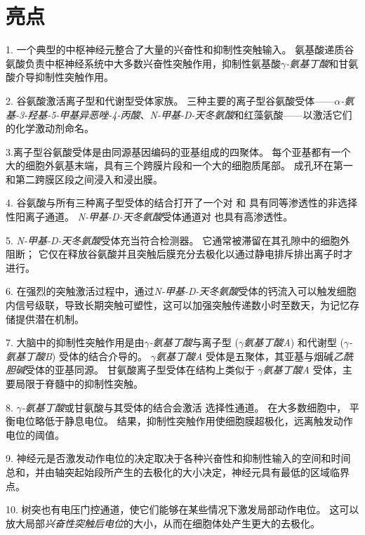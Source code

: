 \section{亮点}

1. 一个典型的中枢神经元整合了大量的兴奋性和抑制性突触输入。
氨基酸递质谷氨酸负责中枢神经系统中大多数兴奋性突触作用，抑制性氨基酸\textit{$\gamma$-氨基丁酸}和甘氨酸介导抑制性突触作用。


2. 谷氨酸激活离子型和代谢型受体家族。
三种主要的离子型谷氨酸受体——\textit{$\alpha$-氨基-3-羟基-5-甲基异恶唑-4-丙酸}、\textit{N-甲基-D-天冬氨酸}和红藻氨酸——以激活它们的化学激动剂命名。 


3.离子型谷氨酸受体是由同源基因编码的亚基组成的四聚体。
每个亚基都有一个大的细胞外氨基末端，具有三个跨膜片段和一个大的细胞质尾部。
成孔环在第一和第二跨膜区段之间浸入和浸出膜。


4. 谷氨酸与所有三种离子型受体的结合打开了一个对  和  具有同等渗透性的非选择性阳离子通道。
\textit{N-甲基-D-天冬氨酸}受体通道对  也具有高渗透性。


5. \textit{N-甲基-D-天冬氨酸}受体充当符合检测器。
它通常被滞留在其孔隙中的细胞外  阻断；
它仅在释放谷氨酸并且突触后膜充分去极化以通过静电排斥排出离子时才进行。 


6. 在强烈的突触激活过程中，通过\textit{N-甲基-D-天冬氨酸}受体的钙流入可以触发细胞内信号级联，导致长期突触可塑性，这可以加强突触传递数小时至数天，为记忆存储提供潜在机制。 


7. 大脑中的抑制性突触作用是由\textit{$\gamma$-氨基丁酸}与离子型 (\textit{$\gamma$氨基丁酸A}) 和代谢型 (\textit{$\gamma$-氨基丁酸B}) 受体的结合介导的。
\textit{$\gamma$氨基丁酸A} 受体是五聚体，其亚基与烟碱\textit{乙酰胆碱}受体的亚基同源。
甘氨酸离子型受体在结构上类似于 \textit{$\gamma$氨基丁酸A} 受体，主要局限于脊髓中的抑制性突触。 


8. \textit{$\gamma$-氨基丁酸}或甘氨酸与其受体的结合会激活  选择性通道。
在大多数细胞中， 平衡电位略低于静息电位。
结果，抑制性突触作用使细胞膜超极化，远离触发动作电位的阈值。


9. 神经元是否激发动作电位的决定取决于各种兴奋性和抑制性输入的空间和时间总和，并由轴突起始段所产生的去极化的大小决定，神经元具有最低的区域临界点。


10. 树突也有电压门控通道，使它们能够在某些情况下激发局部动作电位。
这可以放大局部\textit{兴奋性突触后电位}的大小，从而在细胞体处产生更大的去极化。






